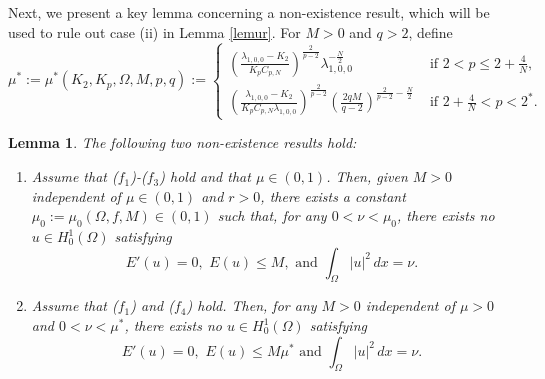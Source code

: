 \documentclass[11pt]{amsart}
\newtheorem{lemma}[theorem]{Lemma}
\newcommand{\abs}[1]{\lvert#1\rvert}
\newcommand{\norm}[1]{\lVert#1\rVert}
\numberwithin{equation}{section}
\begin{document}

Next, we present a key lemma concerning a non-existence result, which will be used to rule out case (ii) in Lemma \ref{lemur}. For $M>0$ and $q >2$, define $$\mu^*:=\mu^*(K_2,K_p,\Omega,M,p,q):=
\begin{cases}
 \left(\frac{\lambda_{1,0,0}-K_2}{K_pC_{p,N}}\right)^{\frac{2}{p-2}}\lambda_{1,0,0}^{-\frac{N}{2}}  &\text{ if } 2<p\leq 2+\frac{4}{N},\\
    \left(\frac{\lambda_{1,0,0}-K_2}{K_pC_{p,N}\lambda_{1,0,0}}\right)^{\frac{2}{p-2}}\left(\frac{2qM}{q-2}\right)^{\frac{2}{p-2}-\frac{N}{2}} &\text{ if }  2+\frac{4}{N}<p<2^*.
\end{cases}$$

\begin{lemma}\label{lemnex}
The following two non-existence results hold:
    \begin{enumerate}[label=\rm(\roman*)]
        \item Assume that ($f_1$)-($f_3$) hold and that $\mu \in (0,1)$. Then, given $M>0$ independent of $\mu \in (0,1)$ and $r>0$, there exists a constant $\mu_0:=\mu_0(\Omega,f,M) \in (0,1)$ such that, for any $0<\nu<\mu_0$, there exists no $u \in H^1_0(\Omega)$ satisfying
             $$
             E'(u) = 0,\,\,E(u)\leq M,\,\,\text{and}\,\,\int_{\Omega}|u|^2\,dx=\nu.
             $$
        \item Assume that ($f_1$) and ($f_4$) hold. Then, for any $M>0$  independent of $\mu >0$ and $0<\nu<\mu^*$, there exists no $u \in H_0^1(\Omega)$ satisfying
             $$
             E'(u) = 0,\,\,E(u)\leq M\mu^*\,\,\text{and}\,\,\int_{\Omega}|u|^2 \,dx=\nu.
             $$
    \end{enumerate}
\end{lemma}
\end{document}
